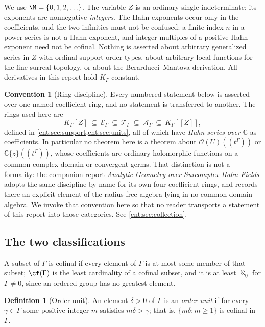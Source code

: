\documentclass[11pt]{article}
\theoremstyle{plain}
\theoremstyle{plain}
\theoremstyle{plain}
\theoremstyle{definition}
\newtheorem{definition}[definition]{Definition}
\theoremstyle{definition}
\newtheorem{convention}[convention]{Convention}
\theoremstyle{definition}
\theoremstyle{definition}
\theoremstyle{remark}
\newcommand{\C}{\mathbb C}\newcommand{\R}{\mathbb R}
\newcommand{\K}{K_\Gamma}\newcommand{\KD}{K_\Delta}
\newcommand{\E}{\mathcal E_\Gamma}
\newcommand{\A}{\mathcal A_\Gamma}\newcommand{\OO}{\mathcal O_\Gamma}
\newcommand{\TT}{\mathcal T_\Gamma}
\begin{document}
We use $\N=\{0,1,2,\ldots\}$. The variable $Z$ is an ordinary single
indeterminate; its exponents are nonnegative \emph{integers}. The Hahn
exponents occur only in the coefficients, and the two infinities must not be
confused: a finite index $n$ in a power series is not a Hahn exponent, and
integer multiples of a positive Hahn exponent need not be cofinal. Nothing
is asserted about arbitrary generalized series in $Z$ with ordinal support
order types, about arbitrary local functions for the fine surreal topology,
or about the Berarducci--Mantova derivation. All derivatives in this report
hold $\K$ constant.

\begin{convention}[Ring discipline]\label{ent:conv:ring}
Every numbered statement below is asserted over one named coefficient ring,
and no statement is transferred to another. The rings used here are
\[
 \K[Z]\ \subseteq\ \E\ \subseteq\ \TT\ \subseteq\ \A\ \subseteq\ \K[[Z]],
\]
defined in \cref{ent:sec:support,ent:sec:units}, all of which have
\emph{Hahn series over $\C$} as coefficients. In particular no theorem here
is a theorem about $\mathcal O(U)((t^\Gamma))$ or $\C\{z\}((t^\Gamma))$,
whose coefficients are ordinary holomorphic functions on a common complex
domain or convergent germs. That distinction is not a formality: the
companion report \emph{Analytic Geometry over Surcomplex Hahn Fields}
adopts the same discipline by name for its own four coefficient rings, and
records there an explicit element of the radius-free algebra lying in no
common-domain algebra. We invoke that convention here so that no reader
transports a statement of this report into those categories. See
\cref{ent:sec:collection}.
\end{convention}

\subsection{The two classifications}
A subset of $\Gamma$ is cofinal if every element of $\Gamma$ is at most some
member of that subset; $\cf(\Gamma)$ is the least cardinality of a cofinal
subset, and it is at least $\aleph_0$ for $\Gamma\ne0$, since an ordered
group has no greatest element.

\begin{definition}[Order unit]\label{ent:def:order-unit}
An element $\delta>0$ of $\Gamma$ is an \emph{order unit} if for every
$\gamma\in\Gamma$ some positive integer $m$ satisfies $m\delta>\gamma$; that
is, $\{m\delta:m\ge1\}$ is cofinal in $\Gamma$.
\end{definition}
\end{document}
